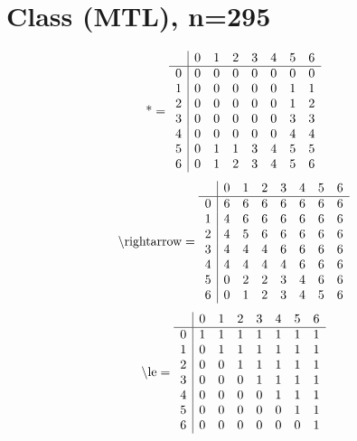 \documentclass[11pt]{article}
\begin{document}
\section{Class (MTL), n=295}
\[\text{*} = 
\begin{array}{r | r r r r r r r}
 & 0 & 1 & 2 & 3 & 4 & 5 & 6 \\ \hline
0 & 0 & 0 & 0 & 0 & 0 & 0 & 0 \\
1 & 0 & 0 & 0 & 0 & 0 & 1 & 1 \\
2 & 0 & 0 & 0 & 0 & 0 & 1 & 2 \\
3 & 0 & 0 & 0 & 0 & 0 & 3 & 3 \\
4 & 0 & 0 & 0 & 0 & 0 & 4 & 4 \\
5 & 0 & 1 & 1 & 3 & 4 & 5 & 5 \\
6 & 0 & 1 & 2 & 3 & 4 & 5 & 6 \\
\end{array}
\]
\[\text{\textbackslash rightarrow} = 
\begin{array}{r | r r r r r r r}
 & 0 & 1 & 2 & 3 & 4 & 5 & 6 \\ \hline
0 & 6 & 6 & 6 & 6 & 6 & 6 & 6 \\
1 & 4 & 6 & 6 & 6 & 6 & 6 & 6 \\
2 & 4 & 5 & 6 & 6 & 6 & 6 & 6 \\
3 & 4 & 4 & 4 & 6 & 6 & 6 & 6 \\
4 & 4 & 4 & 4 & 4 & 6 & 6 & 6 \\
5 & 0 & 2 & 2 & 3 & 4 & 6 & 6 \\
6 & 0 & 1 & 2 & 3 & 4 & 5 & 6 \\
\end{array}
\]
\[\text{\textbackslash le} = 
\begin{array}{r | r r r r r r r}
 & 0 & 1 & 2 & 3 & 4 & 5 & 6 \\ \hline
0 & 1 & 1 & 1 & 1 & 1 & 1 & 1 \\
1 & 0 & 1 & 1 & 1 & 1 & 1 & 1 \\
2 & 0 & 0 & 1 & 1 & 1 & 1 & 1 \\
3 & 0 & 0 & 0 & 1 & 1 & 1 & 1 \\
4 & 0 & 0 & 0 & 0 & 1 & 1 & 1 \\
5 & 0 & 0 & 0 & 0 & 0 & 1 & 1 \\
6 & 0 & 0 & 0 & 0 & 0 & 0 & 1 \\
\end{array}
\]
\end{document}
